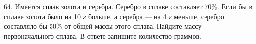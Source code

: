 64. Имеется сплав золота и серебра. Серебро в сплаве составляет $70\%.$ Если бы в сплаве золота было на 10 {\it г} больше, а серебра --- на 4 {\it г} меньше, серебро составляло бы $50\%$ от общей массы этого сплава. Найдите массу первоначального сплава. В ответе запишите количество граммов.\\
